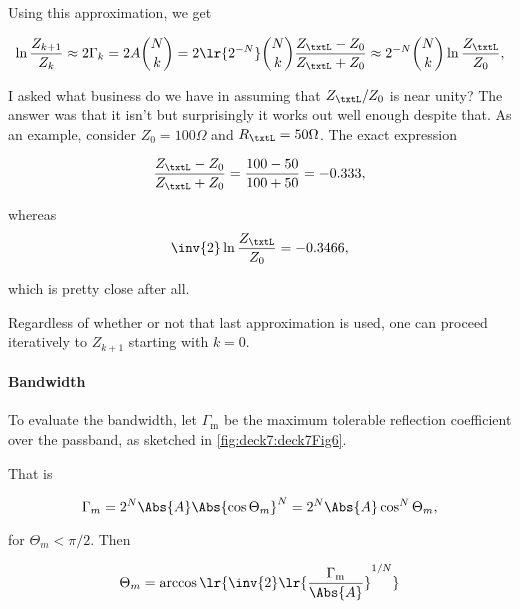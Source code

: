 Using this approximation, we get

\begin{dmath}\label{eqn:uwavesDeck7MultisectionTransformersCore:380}
\ln \frac{Z_{k+1}}{Z_k}
\approx
2 \Gamma_k
= 2 A \binom{N}{k}
= 2 \lr{2^{-N}} \binom{N}{k} \frac{Z_\txtL - Z_0}{Z_\txtL + Z_0}
\approx
2^{-N} \binom{N}{k} \ln \frac{Z_\txtL}{Z_0},
\end{dmath}

I asked what business do we have in assuming that \( Z_\txtL/Z_0 \) is near unity?  The answer was that it isn't but surprisingly it works out well enough despite that.  As an example, consider \( Z_0 = 100 \Omega \) and \( R_\txtL = 50 \Omega \).  The exact expression

\begin{dmath}\label{eqn:uwavesDeck7MultisectionTransformersCore:880}
\frac{Z_\txtL - Z_0}{Z_\txtL + Z_0}
= \frac{100-50}{100+50}
= -0.333,
\end{dmath}

whereas
\begin{dmath}\label{eqn:uwavesDeck7MultisectionTransformersCore:900}
\inv{2} \ln \frac{Z_\txtL}{Z_0} = -0.3466,
\end{dmath}

which is pretty close after all.

Regardless of whether or not that last approximation is used, one can proceed iteratively to \( Z_{k+1} \) starting with \( k = 0 \).

\paragraph{Bandwidth}

To evaluate the bandwidth, let \( \Gamma_{\mathrm{m}} \) be the maximum tolerable reflection coefficient over the passband, as sketched in \cref{fig:deck7:deck7Fig6}.


That is

\begin{dmath}\label{eqn:uwavesDeck7MultisectionTransformersCore:400}
\Gamma_m
= 2^N \Abs{A} \Abs{\cos \Theta_m }^N
= 2^N \Abs{A} \cos^N \Theta_m,
\end{dmath}

for \( \Theta_m < \pi/2 \).  Then

\begin{dmath}\label{eqn:uwavesDeck7MultisectionTransformersCore:420}
\Theta_m = \arccos\lr{ \inv{2} \lr{ \frac{\Gamma_{\mathrm{m}}}{\Abs{A}}}^{1/N} }
\end{dmath}

